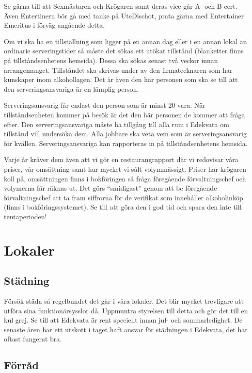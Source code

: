 \documentclass[10pt]{article}
\begin{document}
    Se gärna till att Sexmästaren och Krögaren samt deras vice går A- och B-cert. Även Entertinern bör gå med tanke på UteDischot, prata gärna med Entertainer Emeritus i förväg angående detta.
    
    Om vi ska ha en tillställning som ligger på en annan dag eller i en annan lokal än ordinarie serveringstider så måste det sökas ett utökat tillstånd (blanketter finns på tillståndsenhetens hemsida). Dessa ska sökas senast två veckor innan arrangemanget. Tillståndet ska skrivas under av den firmatecknaren som har kunskaper inom alkohollagen. Det är även den här personen som ska se till att den serveringsansvariga är en lämplig person.
    
    Serveringsansvarig får endast den person som är minst 20 vara. När tillståndsenheten kommer på besök är det den här personen de kommer att fråga efter. Den serveringsansvariga måste ha tillgång till alla rum i Edekvata om tillstånd vill undersöka dem. Alla jobbare ska veta vem som är serveringsansvarig för kvällen. Serveringsansvariga kan rapporteras in på tillståndsenhetens hemsida.
    
    Varje år kräver dem även att vi gör en restaurangrapport där vi redovisar våra priser, vår omsättning samt hur mycket vi sålt volymmässigt. Priser har krögaren koll på, omsättningen finns i bokföringen så fråga föregående förvaltningschef och volymerna får räknas ut. Det görs ``smidigast'' genom att be föregående förvaltningschef att ta fram siffrorna för de verifikat som innehåller alkoholinköp (finns i bokföringssystemet). Se till att göra den i god tid och spara den inte till tentaperioden!
    
    \section{Lokaler}
    
    \subsection{Städning}
    
    Försök städa så regelbundet det går i våra lokaler. Det blir mycket trevligare att utföra sina funktionärsysslor då. Uppmuntra styrelsen till detta och gör det till en kul grej. Se till att Edekvata är rent speciellt innan jul- och sommarledighet. De senaste åren har ett utskott i taget haft ansvar för städningen i Edekvata, det har oftast fungerat bra.
    
    \subsection{Förråd}
    
\end{document}
